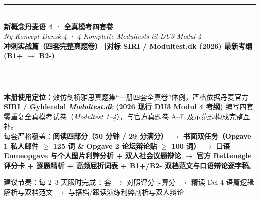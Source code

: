 \documentclass[11pt, a4paper]{ctexart}
\begin{document}
\begin{titlepage}
  \centering
  \vspace*{2.2cm}
  {\color{NCDRed}\rule{\linewidth}{2.5pt}}\\[1.1cm]
  {\fontsize{30}{36}\selectfont\bfseries\color{NCDNavy} 新概念丹麦语 4 · 全真模考四套卷}\\[0.5cm]
  {\LARGE\itshape\color{NCDTeal} Ny Koncept Dansk 4 · 4 Komplette Modultests til DU3 Modul 4}\\[0.8cm]
  {\large\bfseries\color{NCDGray} 冲刺实战篇（四套完整真题卷） \quad|\quad 对标 SIRI / Modultest.dk (2026) 最新考纲 (B1+ $\rightarrow$ B2-)}\\[1.1cm]
  {\color{NCDRed}\rule{\linewidth}{2.5pt}}\\[1.8cm]

  \begin{tcolorbox}[
    colback=NCDBgBlue,
    colframe=NCDNavy,
    width=0.90\linewidth,
    arc=4pt,
    boxrule=0.8pt,
    left=14pt, right=14pt, top=12pt, bottom=12pt
  ]
    \textbf{\color{NCDNavy}本册使用定位：}效仿剑桥雅思真题集“一册四套全真卷”体例，严格依据丹麦官方 \textbf{SIRI / Gyldendal \textit{Modultest.dk} (2026 现行 DU3 Modul 4 考纲)} 编写四套零重复全真模考试卷（\textit{Modultest 1--4}），与官方真题卷 A--E 及示范题构成完整互补。\\[4pt]
    每套严格覆盖：\textbf{阅读四部分（50 分钟 / 29 分满分）} $\rightarrow$ \textbf{书面双任务（Opgave 1 私人邮件 $\ge$ 125 词 \& Opgave 2 论坛辩论贴 $\ge$ 100 词）} $\rightarrow$ \textbf{口语 Emneopgave 与个人图片利弊分析 + 双人社会议题辩论} $\rightarrow$ \textbf{官方 Rettenøgle 评分卡 + 逐题精析 + 高频屈折词表 + B1+/B2- 双档范文与口语辩论逐字稿}。
  \end{tcolorbox}

  \vfill
  {\large\color{NCDGray} 建议节奏：每 2--3 天限时完成 1 套 $\rightarrow$ 对照评分卡算分 $\rightarrow$ 精读 Del 4 语篇逻辑解析与双档范文 $\rightarrow$ 与搭档/跟读演练利弊剖析与双人辩论}
\end{titlepage}

\tableofcontents
\clearpage

{}
\end{document}
